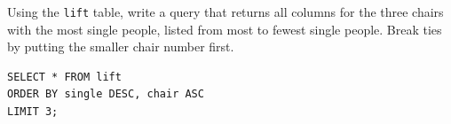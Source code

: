 \begin{blocksection}
\question Using the \lstinline{lift} table, write a query that returns all columns for the three chairs with the most single people, listed from most to fewest single people. Break ties by putting the smaller chair number first.

\begin{solution}[1.5in]
\begin{lstlisting}
SELECT * FROM lift
ORDER BY single DESC, chair ASC
LIMIT 3;
\end{lstlisting}
\end{solution}
\end{blocksection}
